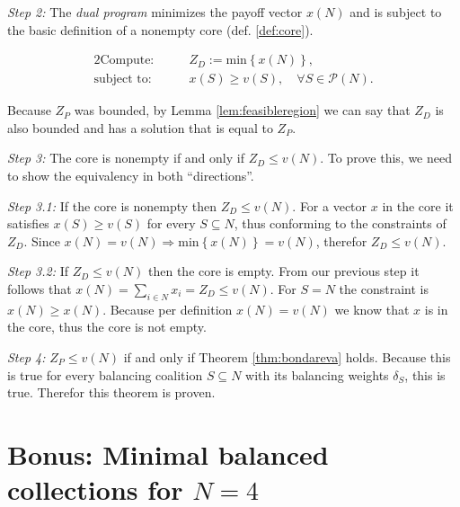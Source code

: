 \documentclass[10pt,a4paper,titlepage]{article}
\theoremstyle{plain}
\theoremstyle{definition}
\begin{document}
\textit{Step 2:} The \textit{dual program} minimizes the payoff vector $x(N)$ and is subject to the basic definition of a nonempty core (def. \ref{def:core}).\vspace{-15pt}

\begin{alignat*}{2}
    \text{Compute:}\qquad& Z_D := \text{min}\left\{x(N)\right\},\\
    \text{subject to:}\qquad& x(S) \geq v(S),\quad \forall S \in \mathcal{P}(N).
\end{alignat*}

Because $Z_P$ was bounded, by Lemma \ref{lem:feasibleregion} we can say that $Z_D$ is also bounded and has a solution that is equal to $Z_P$.\vspace{8pt}

\textit{Step 3:} The core is nonempty if and only if $Z_D \leq v(N)$. To prove this, we need to show the equivalency in both \enquote{directions}.\vspace{8pt}

\textit{Step 3.1:} If the core is nonempty then $Z_D \leq v(N)$. For a vector $x$ in the core it satisfies $x(S) \geq v(S)$ for every $S \subseteq N$, thus conforming to the constraints of $Z_D$. Since $x(N) = v(N) \Rightarrow \text{min}\left\{x(N)\right\} = v(N)$, therefor $Z_D \leq v(N)$.\vspace{8pt}

\textit{Step 3.2:} If $Z_D \leq v(N)$ then the core is empty. From our previous step it follows that $x(N) = \sum_{i \in N} x_i = Z_D \leq v(N)$. For $S = N$ the constraint is $x(N) \geq x(N)$. Because per definition $x(N) = v(N)$ we know that $x$ is in the core, thus the core is not empty.\vspace{8pt}

\textit{Step 4:} $Z_P \leq v(N)$ if and only if Theorem \ref{thm:bondareva} holds. Because this is true for every balancing coalition $S \subseteq N$ with its balancing weights $\delta_S$, this is true. Therefor this theorem is proven.

\pagebreak

\vspace{-30pt}

\section*{Bonus: Minimal balanced collections for $N = 4$}\vspace{-6pt}\label{bonus}
\end{document}
